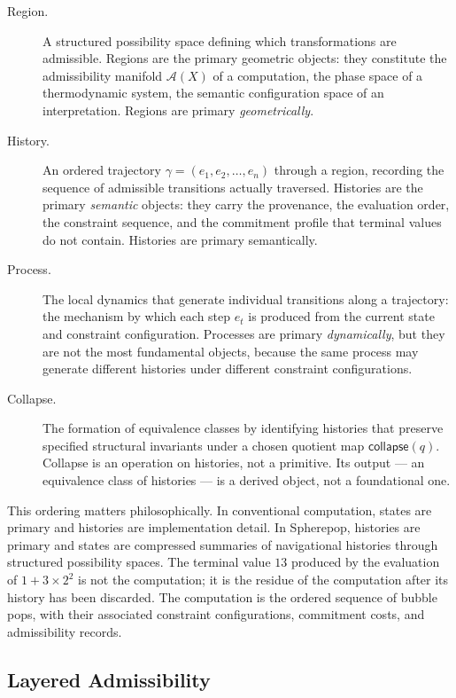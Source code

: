 \documentclass[12pt,openany]{book}
\theoremstyle{plain}
\theoremstyle{definition}
\theoremstyle{remark}
\newcommand{\scollapse}[1]{\mathsf{collapse}\!\left(#1\right)}
\begin{document}
\begin{description}
\item[Region.] A structured possibility space defining which transformations are admissible. Regions are the primary geometric objects: they constitute the admissibility manifold $\mathcal{A}(X)$ of a computation, the phase space of a thermodynamic system, the semantic configuration space of an interpretation. Regions are primary \emph{geometrically}.

\item[History.] An ordered trajectory $\gamma = (e_1, e_2, \ldots, e_n)$ through a region, recording the sequence of admissible transitions actually traversed. Histories are the primary \emph{semantic} objects: they carry the provenance, the evaluation order, the constraint sequence, and the commitment profile that terminal values do not contain. Histories are primary semantically.

\item[Process.] The local dynamics that generate individual transitions along a trajectory: the mechanism by which each step $e_t$ is produced from the current state and constraint configuration. Processes are primary \emph{dynamically}, but they are not the most fundamental objects, because the same process may generate different histories under different constraint configurations.

\item[Collapse.] The formation of equivalence classes by identifying histories that preserve specified structural invariants under a chosen quotient map $\scollapse{q}$. Collapse is an operation on histories, not a primitive. Its output — an equivalence class of histories — is a derived object, not a foundational one.
\end{description}

This ordering matters philosophically. In conventional computation, states are primary and histories are implementation detail. In Spherepop, histories are primary and states are compressed summaries of navigational histories through structured possibility spaces. The terminal value $13$ produced by the evaluation of $1 + 3 \times 2^2$ is not the computation; it is the residue of the computation after its history has been discarded. The computation is the ordered sequence of bubble pops, with their associated constraint configurations, commitment costs, and admissibility records.

\subsection*{Layered Admissibility}
\end{document}

